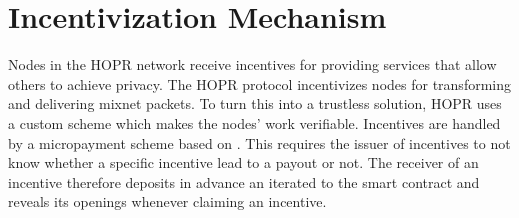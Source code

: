 \section{Incentivization Mechanism}
\label{sec:incentives}

Nodes in the HOPR network receive incentives for providing services that allow others to achieve privacy. The HOPR protocol incentivizes nodes for transforming and delivering mixnet packets. To turn this into a trustless solution, HOPR uses a custom  scheme which makes the nodes' work verifiable. Incentives are handled by a micropayment scheme based on . This requires the issuer of incentives to not know whether a specific incentive lead to a payout or not. The receiver of an incentive therefore deposits in advance an iterated  to the smart contract and reveals its openings whenever claiming an incentive.






